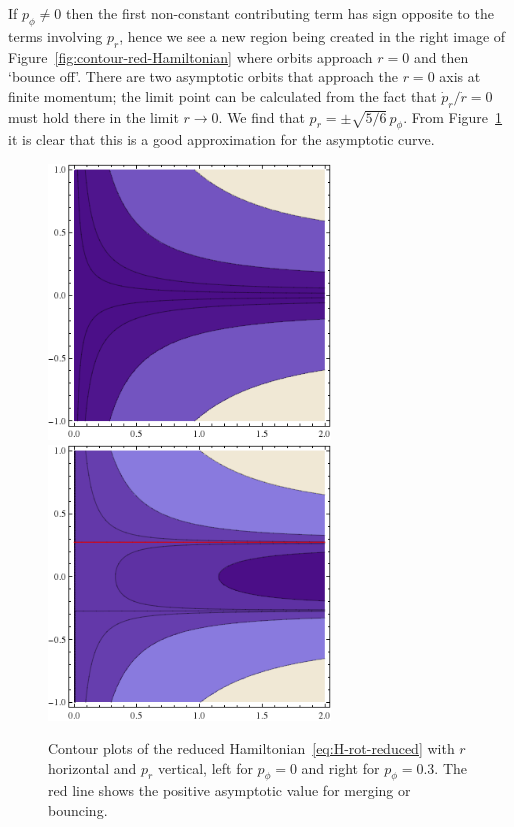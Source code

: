 \documentclass[12pt]{amsart}
\begin{document}
If $p_\phi \neq 0$ then the first non-constant contributing term has
sign opposite to the terms involving $p_r$, hence we see a new region
being created in the right image of Figure~\eqref{fig:contour-red-Hamiltonian} where orbits
approach $r = 0$ and then `bounce off'. There are two asymptotic
orbits that approach the $r = 0$ axis at finite momentum; the limit
point can be calculated from the fact that $\dot{p}_r / \dot{r} = 0$
must hold there in the limit $r \to 0$. We find that
$p_r = \pm \sqrt{5/6}\,p_\phi$. From
Figure~\ref{fig:contour-red-Hamiltonian} it is clear that this is a good
approximation for the asymptotic curve.

\begin{figure}[ht]
  \centering
  \includegraphics[width=7.5cm]{Ham-contour-Jzero.png}
  \hspace{0.5cm}
  \includegraphics[width=7.5cm]{Ham-contour-Jnonzero.png}
  \caption{Contour plots of the reduced
    Hamiltonian~\eqref{eq:H-rot-reduced} with $r$ horizontal and $p_r$
    vertical, left for $p_\phi = 0$ and right for
    $p_\phi = 0.3$. The red line shows the positive asymptotic
    value for merging or bouncing.}
  \label{fig:contour-red-Hamiltonian}
\end{figure}
\end{document}
